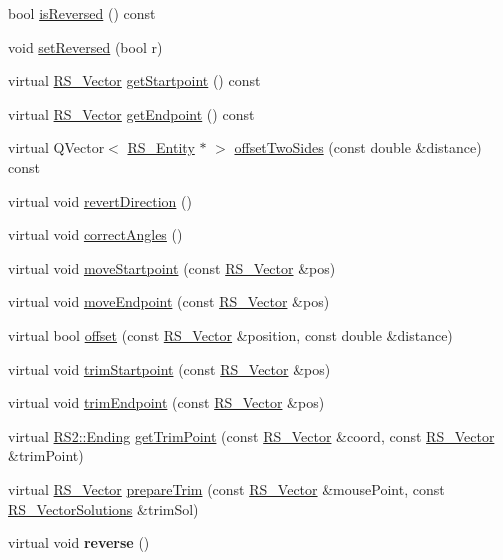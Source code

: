 \begin{DoxyCompactItemize}
bool \hyperlink{classRS__Arc_a2330e9c92cc5238f684d072a092244d8}{is\-Reversed} () const 
\item 
void \hyperlink{classRS__Arc_abf07a321aa9211773b64d477254dbd3c}{set\-Reversed} (bool r)
\item 
virtual \hyperlink{classRS__Vector}{R\-S\-\_\-\-Vector} \hyperlink{classRS__Arc_a164e42bf8304b00504314566ec090ca6}{get\-Startpoint} () const 
\item 
virtual \hyperlink{classRS__Vector}{R\-S\-\_\-\-Vector} \hyperlink{classRS__Arc_a2acc6b78b335cd7f6da72c92c50bd7d7}{get\-Endpoint} () const 
\item 
virtual Q\-Vector$<$ \hyperlink{classRS__Entity}{R\-S\-\_\-\-Entity} $\ast$ $>$ \hyperlink{classRS__Arc_a948f1e0cdc2a1ad2fa2776d0e0777164}{offset\-Two\-Sides} (const double \&distance) const 
\item 
virtual void \hyperlink{classRS__Arc_a1dfb864e7391da9de1c8fdc67cad097f}{revert\-Direction} ()
\item 
virtual void \hyperlink{classRS__Arc_a3a6d084ee57b332ff9b4ae0d80628410}{correct\-Angles} ()
\item 
virtual void \hyperlink{classRS__Arc_ab4968fb761a2cac0f8080e2daf7e245c}{move\-Startpoint} (const \hyperlink{classRS__Vector}{R\-S\-\_\-\-Vector} \&pos)
\item 
virtual void \hyperlink{classRS__Arc_a5a22322551fed295cddc0c0291ddc981}{move\-Endpoint} (const \hyperlink{classRS__Vector}{R\-S\-\_\-\-Vector} \&pos)
\item 
virtual bool \hyperlink{classRS__Arc_aa7da3f3ea0ece264776e3f7cb25e669e}{offset} (const \hyperlink{classRS__Vector}{R\-S\-\_\-\-Vector} \&position, const double \&distance)
\item 
virtual void \hyperlink{classRS__Arc_a39e504c46aa4d170f1eaa7003a717d97}{trim\-Startpoint} (const \hyperlink{classRS__Vector}{R\-S\-\_\-\-Vector} \&pos)
\item 
virtual void \hyperlink{classRS__Arc_a76b1aa831a29680073d19c3c30376ba2}{trim\-Endpoint} (const \hyperlink{classRS__Vector}{R\-S\-\_\-\-Vector} \&pos)
\item 
virtual \hyperlink{classRS2_a30e80df2ef4bb36f4e89ea500eb212ab}{R\-S2\-::\-Ending} \hyperlink{classRS__Arc_a072620b15c20afc2f828839a4c4273e9}{get\-Trim\-Point} (const \hyperlink{classRS__Vector}{R\-S\-\_\-\-Vector} \&coord, const \hyperlink{classRS__Vector}{R\-S\-\_\-\-Vector} \&trim\-Point)
\item 
virtual \hyperlink{classRS__Vector}{R\-S\-\_\-\-Vector} \hyperlink{classRS__Arc_ae252c5cc0dbe83656c155d53088d12fa}{prepare\-Trim} (const \hyperlink{classRS__Vector}{R\-S\-\_\-\-Vector} \&mouse\-Point, const \hyperlink{classRS__VectorSolutions}{R\-S\-\_\-\-Vector\-Solutions} \&trim\-Sol)
\item 
\hypertarget{classRS__Arc_a12c26b3d7d3eb3fd781bec3e8e9b984f}{virtual void {\bfseries reverse} ()}\label{classRS__Arc_a12c26b3d7d3eb3fd781bec3e8e9b984f}


\end{DoxyCompactItemize}
